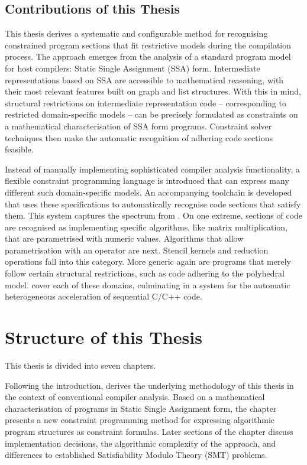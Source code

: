 \subsection{Contributions of this Thesis}

    This thesis derives a systematic and configurable method for recognising
    constrained program sections that fit restrictive models during the
    compilation process.
    The approach emerges from the analysis of a standard program model for
    host compilers: Static Single Assignment (SSA) form.
    Intermediate representations based on SSA are accessible to mathematical
    reasoning, with their most relevant features built on graph and list
    structures.
    With this in mind, structural restrictions on intermediate representation
    code -- corresponding to restricted domain-specific models -- can be
    precisely formulated as constraints on a mathematical characterisation of
    SSA form programs.
    Constraint solver techniques then make the automatic recognition of
    adhering code sections feasible.

    Instead of manually implementing sophisticated compiler analysis
    functionality, a flexible constraint programming language is introduced
    that can express many different such domain-specific models.
    An accompanying toolchain is developed that uses these specifications to
    automatically recognise code sections that satisfy them.
    This system captures the spectrum from .
    On one extreme, sections of code are recognised as implementing
    specific algorithms, like matrix multiplication, that are parametrised with
    numeric values.
    Algorithms that allow parametrisation with an operator are next.
    Stencil kernels and reduction operations fall into this category.
    More generic again are programs that merely follow certain structural
    restrictions, such as code adhering to the polyhedral model.
     cover each of these
    domains, culminating in a system for the automatic heterogeneous
    acceleration of sequential C/C++ code.

\section{Structure of this Thesis}

    This thesis is divided into seven chapters.

    Following the introduction, {\bf{}} derives the
    underlying methodology of this thesis in the context of conventional
    compiler analysis.
    Based on a mathematical characterisation of programs in Static Single
    Assignment form, the chapter presents a new constraint programming method
    for expressing algorithmic program structures as constraint formulas.
    Later sections of the chapter discuss implementation decisions,
    the algorithmic complexity of the approach, and differences to established
    Satisfiability Modulo Theory (SMT) problems.


